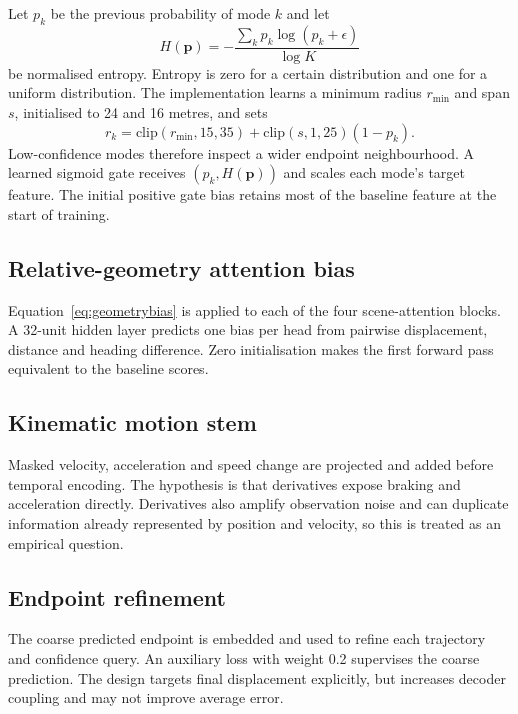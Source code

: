 Let $p_k$ be the previous probability of mode $k$ and let
\begin{equation}
    H(\mathbf{p})=-\frac{\sum_k p_k\log(p_k+\epsilon)}{\log K}
\end{equation}
be normalised entropy. Entropy is zero for a certain distribution and one for a uniform distribution. The implementation learns a minimum radius $r_{\min}$ and span $s$, initialised to 24 and 16 metres, and sets
\begin{equation}
    r_k=\mathrm{clip}(r_{\min},15,35)+
    \mathrm{clip}(s,1,25)(1-p_k).
    \label{eq:uncertaintyradius}
\end{equation}
Low-confidence modes therefore inspect a wider endpoint neighbourhood. A learned sigmoid gate receives $(p_k,H(\mathbf{p}))$ and scales each mode's target feature. The initial positive gate bias retains most of the baseline feature at the start of training.

\subsection{Relative-geometry attention bias}

Equation~\ref{eq:geometrybias} is applied to each of the four scene-attention blocks. A 32-unit hidden layer predicts one bias per head from pairwise displacement, distance and heading difference. Zero initialisation makes the first forward pass equivalent to the baseline scores.

\subsection{Kinematic motion stem}

Masked velocity, acceleration and speed change are projected and added before temporal encoding. The hypothesis is that derivatives expose braking and acceleration directly. Derivatives also amplify observation noise and can duplicate information already represented by position and velocity, so this is treated as an empirical question.

\subsection{Endpoint refinement}

The coarse predicted endpoint is embedded and used to refine each trajectory and confidence query. An auxiliary loss with weight 0.2 supervises the coarse prediction. The design targets final displacement explicitly, but increases decoder coupling and may not improve average error.

